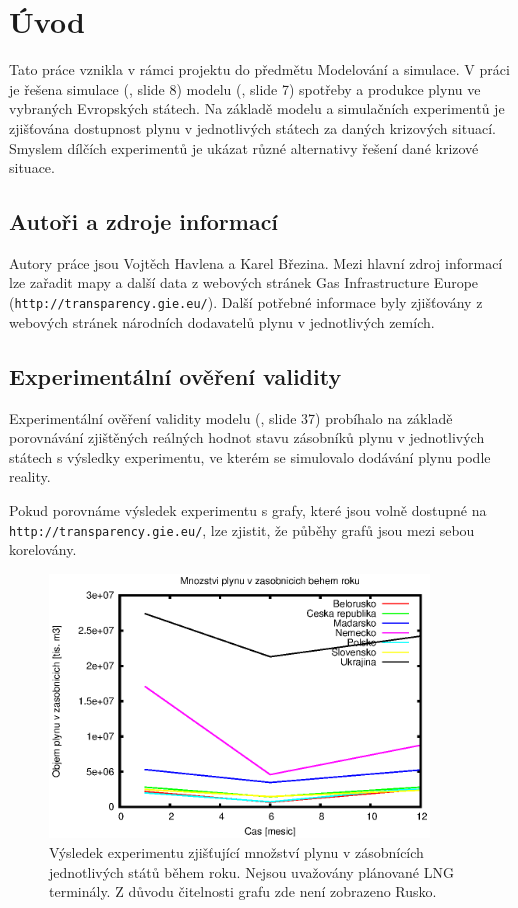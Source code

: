 \documentclass[a4paper,12pt]{article}
\begin{document}
  
  
  \tableofcontents
  
  \newpage
  \section{Úvod}
  Tato práce vznikla v rámci projektu do předmětu Modelování a simulace. V práci 
  je řešena simulace (\cite{peringer}, slide 8) modelu (\cite{peringer}, slide 7) spotřeby a produkce plynu ve vybraných 
  Evropských státech. Na základě modelu a simulačních experimentů je zjišťována 
  dostupnost plynu v jednotlivých státech za daných krizových situací. Smyslem 
  dílčích experimentů je ukázat různé alternativy řešení dané krizové situace.
  
  \subsection{Autoři a zdroje informací}
  Autory práce jsou Vojtěch Havlena a Karel Březina. Mezi hlavní zdroj informací 
  lze zařadit mapy a další data z webových stránek Gas Infrastructure Europe \-
  (\texttt{http://transparency.gie.eu/}). Další 
  potřebné informace byly zjišťovány z webových stránek národních dodavatelů plynu 
  v jednotlivých zemích.
  
  \subsection{Experimentální ověření validity}
  Experimentální ověření validity modelu (\cite{peringer}, slide 37) probíhalo na základě porovnávání zjištěných 
  reálných hodnot stavu zásobníků plynu v jednotlivých státech s výsledky experimentu, 
  ve kterém se simulovalo dodávání plynu podle reality.
  
  Pokud porovnáme výsledek experimentu s grafy, které jsou volně dostupné na  
  \texttt{http://transparency.gie.eu/}, lze zjistit, 
  že půběhy grafů jsou mezi sebou korelovány.
  
  \begin{figure}[!ht]
    \centering
    \includegraphics[height=7cm]{img/val.eps}
    \caption{Výsledek experimentu zjišťující množství plynu v zásobnících jednotlivých států 
    během roku. Nejsou uvažovány plánované LNG terminály. Z důvodu čitelnosti grafu zde není zobrazeno Rusko.}
  \end{figure}
  
\end{document}
